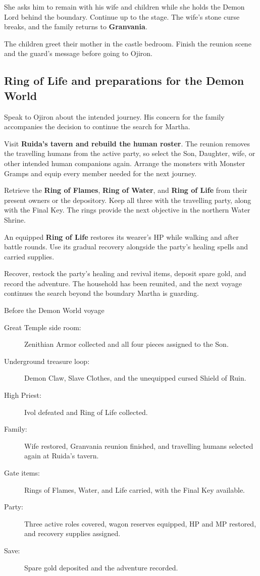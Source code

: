She asks him to remain with his wife and children while
she holds the Demon Lord behind the boundary. Continue
up to the stage. The wife's stone curse breaks, and the
family returns to \textbf{Granvania}.

The children greet their mother in the castle bedroom.
Finish the reunion scene and the guard's message before
going to Ojiron.

\subsection{Ring of Life and preparations for the Demon World}

Speak to Ojiron about the intended journey. His concern
for the family accompanies the decision to continue the
search for Martha.

Visit \textbf{Ruida's tavern and rebuild the human roster}.
The reunion removes the travelling humans from the active
party, so select the Son, Daughter, wife, or other intended
human companions again. Arrange the monsters with Monster
Gramps and equip every member needed for the next journey.

Retrieve the \textbf{Ring of Flames}, \textbf{Ring of Water},
and \textbf{Ring of Life} from their present owners or
the depository. Keep all three with the travelling party,
along with the Final Key. The rings provide the next
objective in the northern Water Shrine.

An equipped \textbf{Ring of Life} restores its wearer's HP
while walking and after battle rounds. Use its gradual recovery
alongside the party's healing spells and carried supplies.

Recover, restock the party's healing and revival items,
deposit spare gold, and record the adventure. The household
has been reunited, and the next voyage continues the
search beyond the boundary Martha is guarding.

\begin{routecheck}[breakable=false]{Before the Demon World voyage}
\begin{description}
  \item[Great Temple side room:] Zenithian Armor collected and
    all four pieces assigned to the Son.
  \item[Underground treasure loop:] Demon Claw, Slave Clothes,
    and the unequipped cursed Shield of Ruin.
  \item[High Priest:] Ivol defeated and Ring of Life collected.
  \item[Family:] Wife restored, Granvania reunion finished,
    and travelling humans selected again at Ruida's tavern.
  \item[Gate items:] Rings of Flames, Water, and Life carried,
    with the Final Key available.
  \item[Party:] Three active roles covered, wagon reserves
    equipped, HP and MP restored, and recovery supplies assigned.
  \item[Save:] Spare gold deposited and the adventure recorded.
\end{description}
\end{routecheck}

